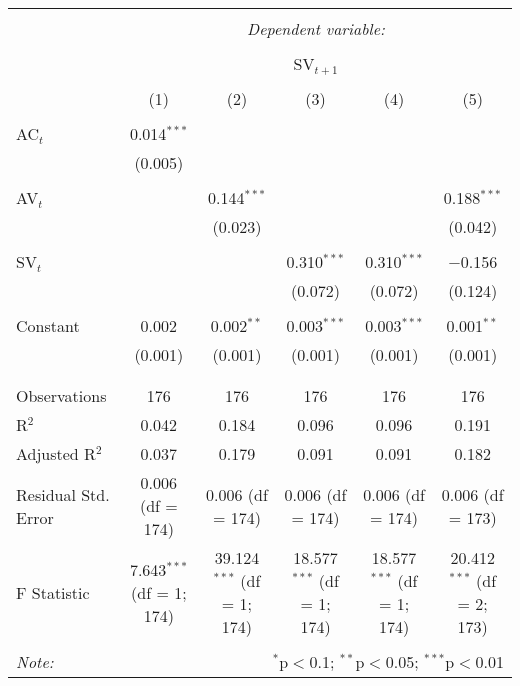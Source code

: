 
\begin{table}[!htbp] \centering 
  \caption{} 
  \label{} 
\begin{tabular}{@{\extracolsep{5pt}}lccccc} 
\\[-1.8ex]\hline 
\hline \\[-1.8ex] 
 & \multicolumn{5}{c}{\textit{Dependent variable:}} \\ 
\cline{2-6} 
\\[-1.8ex] & \multicolumn{5}{c}{SV$_{t+1}$} \\ 
\\[-1.8ex] & (1) & (2) & (3) & (4) & (5)\\ 
\hline \\[-1.8ex] 
 AC$_{t}$ & 0.014$^{***}$ &  &  &  &  \\ 
  & (0.005) &  &  &  &  \\ 
  & & & & & \\ 
 AV$_{t}$ &  & 0.144$^{***}$ &  &  & 0.188$^{***}$ \\ 
  &  & (0.023) &  &  & (0.042) \\ 
  & & & & & \\ 
 SV$_{t}$ &  &  & 0.310$^{***}$ & 0.310$^{***}$ & $-$0.156 \\ 
  &  &  & (0.072) & (0.072) & (0.124) \\ 
  & & & & & \\ 
 Constant & 0.002 & 0.002$^{**}$ & 0.003$^{***}$ & 0.003$^{***}$ & 0.001$^{**}$ \\ 
  & (0.001) & (0.001) & (0.001) & (0.001) & (0.001) \\ 
  & & & & & \\ 
\hline \\[-1.8ex] 
Observations & 176 & 176 & 176 & 176 & 176 \\ 
R$^{2}$ & 0.042 & 0.184 & 0.096 & 0.096 & 0.191 \\ 
Adjusted R$^{2}$ & 0.037 & 0.179 & 0.091 & 0.091 & 0.182 \\ 
Residual Std. Error & 0.006 (df = 174) & 0.006 (df = 174) & 0.006 (df = 174) & 0.006 (df = 174) & 0.006 (df = 173) \\ 
F Statistic & 7.643$^{***}$ (df = 1; 174) & 39.124$^{***}$ (df = 1; 174) & 18.577$^{***}$ (df = 1; 174) & 18.577$^{***}$ (df = 1; 174) & 20.412$^{***}$ (df = 2; 173) \\ 
\hline 
\hline \\[-1.8ex] 
\textit{Note:}  & \multicolumn{5}{r}{$^{*}$p$<$0.1; $^{**}$p$<$0.05; $^{***}$p$<$0.01} \\ 
\end{tabular} 
\end{table} 
